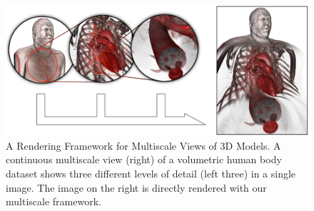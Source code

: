 \begin{figure}[th]
\centering
\includegraphics[width=\textwidth]{Figures/multiscale3d}
\decoRule
\caption[ multiscale ]{ A Rendering Framework for Multiscale Views of 3D Models. A continuous multiscale view (right) of a volumetric human body dataset shows three different levels of detail (left three) in a single image. The image on the right is directly rendered with our multiscale framework.}
\label{fig:multiscale}
\end{figure} 
 
